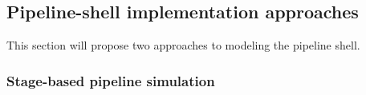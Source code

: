 
%

%
%
%
%
%
%
%

\subsection{Pipeline-shell implementation approaches}

This section will propose two approaches to modeling the pipeline shell.

\subsubsection{Stage-based pipeline simulation}
\label{sec:stagebased}

